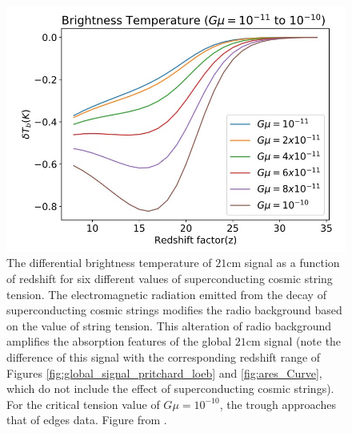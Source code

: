 \documentclass[12pt, TexShade, letterpaper]{report}
\begin{document}
\begin{figure}[h!]
    \centering
    \includegraphics[scale = 0.8]{21cm_cosmic_string.jpg}
    \caption[The global $\mathrm{21cm}$ for different values of superconducting cosmic string tension]{The differential brightness temperature of $\mathrm{21cm}$ signal as a function of redshift for six different values of superconducting cosmic string tension. The electromagnetic radiation emitted from the decay of superconducting cosmic strings modifies the radio background based on the value of string tension. This alteration of radio background amplifies the absorption features of the global $\mathrm{21cm}$ signal (note the difference of this signal with the corresponding redshift range of Figures \ref{fig:global_signal_pritchard_loeb} and \ref{fig:ares_Curve}, which do not include the effect of superconducting cosmic strings). For the critical tension value of $G\mu = 10 ^{-10}$, the trough approaches that of \gls{edges} data. Figure from \cite{cosmic_string_jordan_robert}.}
    \label{fig:21cm_cosmic_string}
\end{figure}

\end{document}
